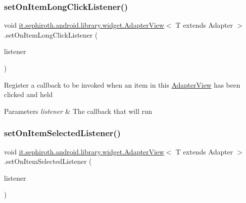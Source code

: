\subsubsection{\texorpdfstring{set\+On\+Item\+Long\+Click\+Listener()}{setOnItemLongClickListener()}}
{\footnotesize\ttfamily void \hyperlink{classit_1_1sephiroth_1_1android_1_1library_1_1widget_1_1_adapter_view}{it.\+sephiroth.\+android.\+library.\+widget.\+Adapter\+View}$<$ T extends Adapter $>$.set\+On\+Item\+Long\+Click\+Listener (\begin{DoxyParamCaption}\item[{\hyperlink{interfaceit_1_1sephiroth_1_1android_1_1library_1_1widget_1_1_adapter_view_1_1_on_item_long_click_listener}{On\+Item\+Long\+Click\+Listener}}]{listener }\end{DoxyParamCaption})}

Register a callback to be invoked when an item in this \hyperlink{classit_1_1sephiroth_1_1android_1_1library_1_1widget_1_1_adapter_view}{Adapter\+View} has been clicked and held


\begin{DoxyParams}{Parameters}
{\em listener} & The callback that will run \\
\hline
\end{DoxyParams}
\mbox{\label{classit_1_1sephiroth_1_1android_1_1library_1_1widget_1_1_adapter_view_ae0527cc6125c98b73dfb4a887fb0d94e}} 
\subsubsection{\texorpdfstring{set\+On\+Item\+Selected\+Listener()}{setOnItemSelectedListener()}}
{\footnotesize\ttfamily void \hyperlink{classit_1_1sephiroth_1_1android_1_1library_1_1widget_1_1_adapter_view}{it.\+sephiroth.\+android.\+library.\+widget.\+Adapter\+View}$<$ T extends Adapter $>$.set\+On\+Item\+Selected\+Listener (\begin{DoxyParamCaption}\item[{\hyperlink{interfaceit_1_1sephiroth_1_1android_1_1library_1_1widget_1_1_adapter_view_1_1_on_item_selected_listener}{On\+Item\+Selected\+Listener}}]{listener }\end{DoxyParamCaption})}

